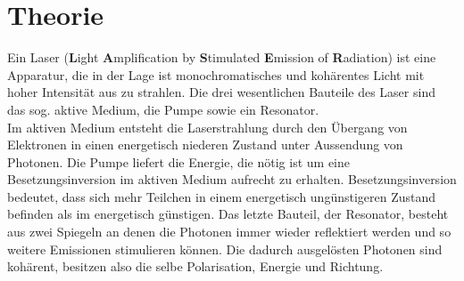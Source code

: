 
\section{Theorie}
\label{sec:Theorie}
Ein Laser (\textbf{L}ight \textbf{A}mplification by \textbf{S}timulated \textbf{E}mission of \textbf{R}adiation) ist eine Apparatur, die in der Lage ist
monochromatisches und kohärentes Licht mit hoher Intensität aus zu strahlen. Die drei wesentlichen Bauteile des Laser sind das sog. aktive Medium, die Pumpe sowie ein Resonator. \\
Im aktiven Medium entsteht die Laserstrahlung durch den Übergang von Elektronen in einen energetisch niederen Zustand unter Aussendung von Photonen.
Die Pumpe liefert die Energie, die nötig ist um eine Besetzungsinversion im aktiven Medium aufrecht zu erhalten. Besetzungsinversion bedeutet, dass sich mehr Teilchen in einem
energetisch ungünstigeren Zustand befinden als im energetisch günstigen.
Das letzte Bauteil, der Resonator, besteht aus zwei Spiegeln an denen die Photonen immer wieder reflektiert werden und so weitere Emissionen stimulieren können.
Die dadurch ausgelösten Photonen sind kohärent, besitzen also die selbe Polarisation, Energie und Richtung.
